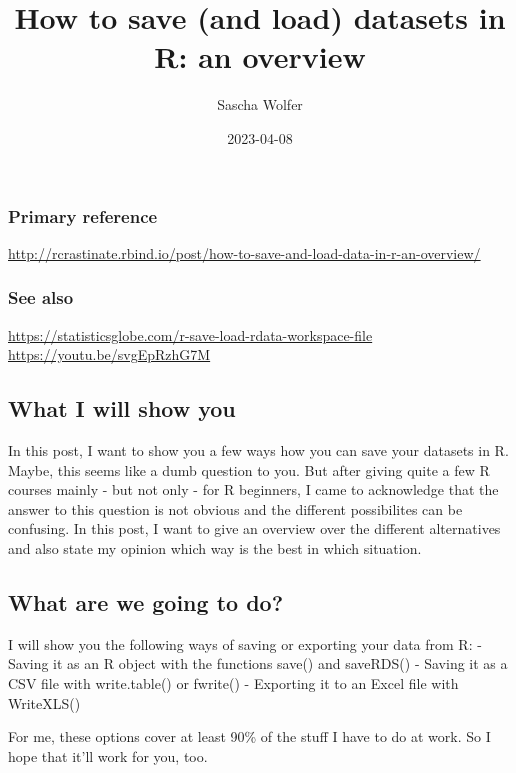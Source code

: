 \documentclass[
]{article}
\title{How to save (and load) datasets in R: an overview}
\author{Sascha Wolfer}
\date{2023-04-08}
\begin{document}
\maketitle

\hypertarget{primary-reference}{%
\subsubsection{Primary reference}\label{primary-reference}}

\url{http://rcrastinate.rbind.io/post/how-to-save-and-load-data-in-r-an-overview/}

\hypertarget{see-also}{%
\subsubsection{See also}\label{see-also}}

\url{https://statisticsglobe.com/r-save-load-rdata-workspace-file}
\url{https://youtu.be/svgEpRzhG7M}

\hypertarget{what-i-will-show-you}{%
\subsection{What I will show you}\label{what-i-will-show-you}}

In this post, I want to show you a few ways how you can save your
datasets in R. Maybe, this seems like a dumb question to you. But after
giving quite a few R courses mainly - but not only - for R beginners, I
came to acknowledge that the answer to this question is not obvious and
the different possibilites can be confusing. In this post, I want to
give an overview over the different alternatives and also state my
opinion which way is the best in which situation.

\hypertarget{what-are-we-going-to-do}{%
\subsection{What are we going to do?}\label{what-are-we-going-to-do}}

I will show you the following ways of saving or exporting your data from
R: - Saving it as an R object with the functions save() and saveRDS() -
Saving it as a CSV file with write.table() or fwrite() - Exporting it to
an Excel file with WriteXLS()

For me, these options cover at least 90\% of the stuff I have to do at
work. So I hope that it'll work for you, too.
\end{document}
